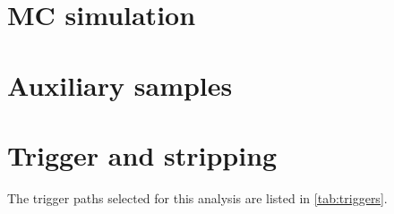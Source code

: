 \section{MC simulation}
\label{ref:selection:mc}


\section{Auxiliary samples}
\label{ref:selection:aux-study}


\section{Trigger and stripping}
\label{ref:selection:stripping}

The trigger paths selected for this analysis are listed in \cref{tab:triggers}.



